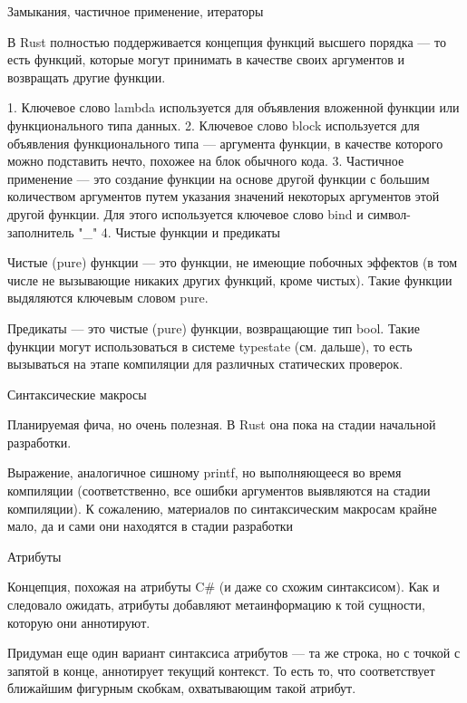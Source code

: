 \documentclass[12pt]{article}
\begin{document}
Замыкания, частичное применение, итераторы

В Rust полностью поддерживается концепция функций высшего порядка — то есть функций, которые могут принимать в качестве своих аргументов и возвращать другие функции.

1.	Ключевое слово lambda используется для объявления вложенной функции или функционального типа данных.
2.	Ключевое слово block используется для объявления функционального типа — аргумента функции, в качестве которого можно подставить нечто, похожее на блок обычного кода.
3.	Частичное применение — это создание функции на основе другой функции с большим количеством аргументов путем указания значений некоторых аргументов этой другой функции. Для этого используется ключевое слово bind и символ-заполнитель "\_"
4.	Чистые функции и предикаты

Чистые (pure) функции — это функции, не имеющие побочных эффектов (в том числе не вызывающие никаких других функций, кроме чистых). Такие функции выдяляются ключевым словом pure.

Предикаты — это чистые (pure) функции, возвращающие тип bool. Такие функции могут использоваться в системе typestate (см. дальше), то есть вызываться на этапе компиляции для различных статических проверок.

Синтаксические макросы

Планируемая фича, но очень полезная. В Rust она пока на стадии начальной разработки. 

Выражение, аналогичное сишному printf, но выполняющееся во время компиляции (соответственно, все ошибки аргументов выявляются на стадии компиляции). К сожалению, материалов по синтаксическим макросам крайне мало, да и сами они находятся в стадии разработки

Атрибуты

Концепция, похожая на атрибуты C\# (и даже со схожим синтаксисом). Как и следовало ожидать, атрибуты добавляют метаинформацию к той сущности, которую они аннотируют. 

Придуман еще один вариант синтаксиса атрибутов — та же строка, но с точкой с запятой в конце, аннотирует текущий контекст. То есть то, что соответствует ближайшим фигурным скобкам, охватывающим такой атрибут.
\end{document}
